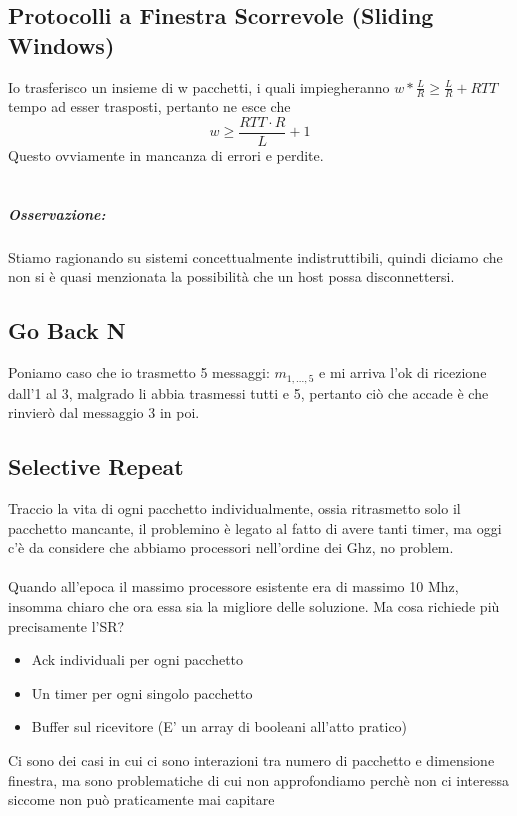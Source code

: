 \documentclass[12pt, a4paper, openany, twoside]{book}
\begin{document}
\subsection{Protocolli a Finestra Scorrevole (Sliding Windows)}
Io trasferisco un insieme di w pacchetti, i quali impiegheranno $w*\frac{L}{R} 
\geq \frac{L}{R}+RTT$ tempo ad esser trasposti, pertanto ne esce che
$$w \geq \frac{RTT\cdot R}{L} +1$$
Questo ovviamente in mancanza di errori e perdite.
\\ \\
\subparagraph{Osservazione:} Stiamo ragionando su sistemi concettualmente 
indistruttibili, quindi diciamo che non si è quasi menzionata la possibilità che
un host possa disconnettersi.
\subsection{Go Back N} 
Poniamo caso che io trasmetto 5 messaggi: $m_{1, ..., 5}$ e mi arriva l'ok di
ricezione dall'1 al 3, malgrado li abbia trasmessi tutti e 5, pertanto ciò che
accade è che rinvierò dal messaggio 3 in poi.
\subsection{Selective Repeat}
Traccio la vita di ogni pacchetto individualmente, ossia ritrasmetto solo il
pacchetto mancante, il problemino è legato al fatto di avere tanti timer, ma
oggi c'è da considere che abbiamo processori nell'ordine dei Ghz, no problem.
\\ \\ 
Quando all'epoca il massimo processore esistente era di massimo 10 Mhz, insomma
chiaro che ora essa sia la migliore delle soluzione. Ma cosa richiede più precisamente
l'SR?
\begin{itemize}
	\item Ack individuali per ogni pacchetto
	\item Un timer per ogni singolo pacchetto
	\item Buffer sul ricevitore (E' un array di booleani all'atto pratico)
\end{itemize}
Ci sono dei casi in cui ci sono interazioni tra numero di pacchetto e dimensione
finestra, ma sono problematiche di cui non approfondiamo perchè non ci interessa
siccome non può praticamente mai capitare
\end{document}
